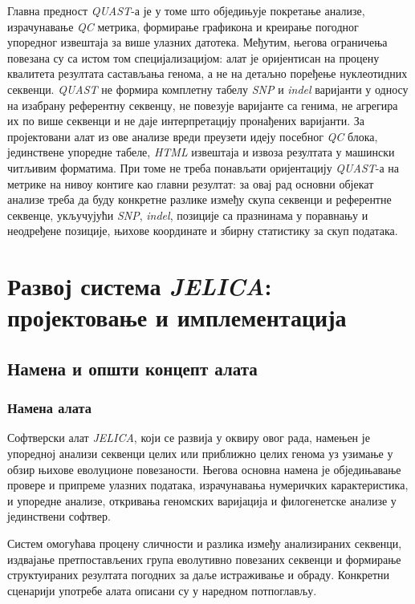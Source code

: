 \documentclass[12pt,oneside]{memoir}
\begin{document}
Главна предност \textit{QUAST}-а је у томе што обједињује покретање анализе, израчунавање \textit{QC} метрика, формирање графикона и креирање погодног упоредног извештаја за више улазних датотека. Међутим, његова ограничења повезана су са истом том специјализацијом: алат је оријентисан на процену квалитета резултата састављања генома, а не на детаљно поређење нуклеотидних секвенци. \textit{QUAST} не формира комплетну табелу \textit{SNP} и \textit{indel} варијанти у односу на изабрану референтну секвенцу, не повезује варијанте са генима, не агрегира их по више секвенци и не даје интерпретацију пронађених варијанти. За пројектовани алат из ове анализе вреди преузети идеју посебног \textit{QC} блока, јединствене упоредне табеле, \textit{HTML} извештаја и извоза резултата у машински читљивим форматима. При томе не треба понављати оријентацију \textit{QUAST}-а на метрике на нивоу контиге као главни резултат: за овај рад основни објекат анализе треба да буду конкретне разлике између скупа секвенци и референтне секвенце, укључујући \textit{SNP}, \textit{indel}, позиције са празнинама у поравнању и неодређене позиције, њихове координате и збирну статистику за скуп података.


\chapter{Развој система \textit{JELICA}: пројектовање и имплементација}
\label{ch:system-development}

\section{Намена и општи концепт алата}
\subsection{Намена алата}
Софтверски алат \textit{JELICA}, који се развија у оквиру овог рада, намењен је упоредној анализи секвенци целих или приближно целих генома уз узимање у обзир њихове еволуционе повезаности. Његова основна намена је обједињавање провере и припреме улазних података, израчунавања нумеричких карактеристика, и упоредне анализе, откривања геномских варијација и филогенетске анализе у јединствени софтвер.

Систем омогућава процену сличности и разлика између анализираних секвенци, издвајање претпостављених група еволутивно повезаних секвенци и формирање структуираних резултата погодних за даље истраживање и обраду. Конкретни сценарији употребе алата описани су у наредном потпоглављу.
\end{document}
